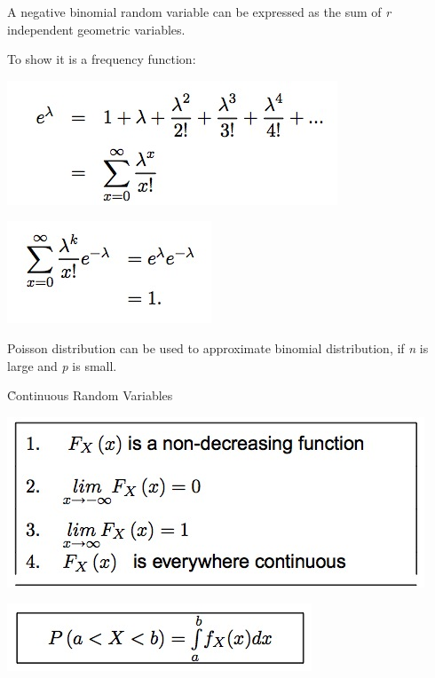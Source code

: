 \documentclass{examnotes}
\begin{document}
\clearpage
{}

A negative binomial random variable can be expressed as the sum of \emph{r} independent geometric variables.

{
\vspace{6pt}



To show it is a frequency function: 

\includegraphics[scale=0.7]{./img/2poi1.jpg}

\includegraphics[scale=0.7]{./img/2poi2.jpg}

Poisson distribution can be used to approximate binomial distribution, if \emph{n} is large and \emph{p} is small.

\h{Continuous Random Variables}

\includegraphics[scale=0.7]{./img/2con1.jpg}

\includegraphics[scale=0.7]{./img/2con2.jpg}

}
\end{document}
